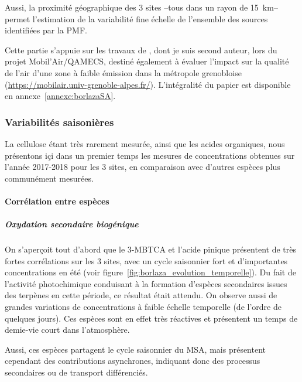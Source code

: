 Aussi, la proximité géographique des 3 sites --tous dans un rayon de \SI{15}{\kilo\m}--
permet l'estimation de la variabilité fine échelle de l'ensemble des sources identifiées
par la PMF.

\begin{tcolorbox}[colback=red!5!white,colframe=Melon,title=Note]
    Cette partie s'appuie sur les travaux de \cite{borlazaFinescaleinprep.}, dont je suis
    second auteur, lors du projet Mobil'Air/QAMECS, destiné également à évaluer l'impact
    sur la qualité de l'air d'une zone à faible émission dans la métropole grenobloise
    (\url{https://mobilair.univ-grenoble-alpes.fr/}).
    L'intégralité du papier est disponible en annexe~\ref{annexe:borlazaSA}.
\end{tcolorbox}

\subsubsection{Variabilités saisonières}%
\label{ssub:variabilites_saisonières}

La cellulose étant très rarement mesurée, ainsi que les acides organiques, nous
présentons içi dans un premier temps les mesures de concentrations obtenues sur l'année
2017-2018 pour les 3 sites, en comparaison avec d'autres espèces plus communément
mesurées.

\paragraph{Corrélation entre espèces}%
\label{par:correlation_entre_especes}

\subparagraph{Oxydation secondaire biogénique}%
\label{par:oxydation_secondaire_biogénique}

On s'aperçoit tout d'abord que le 3-MBTCA et l'acide pinique présentent de très fortes
corrélations sur les 3 sites, avec un cycle saisonnier fort et d'importantes concentrations
en été (voir figure~\ref{fig:borlaza_evolution_temporelle}). Du fait de l'activité
photochimique conduisant à la formation d'espèces secondaires issues des terpènes en
cette période, ce résultat était attendu. On observe aussi de grandes variations de
concentrations à faible échelle temporelle (de l'ordre de quelques jours). Ces espèces
sont en effet très réactives et présentent un temps de demie-vie court dans l'atmosphère.

Aussi, ces espèces partagent le cycle saisonnier du MSA, mais présentent cependant des
contributions asynchrones, indiquant donc des processus secondaires ou de transport
différenciés.

